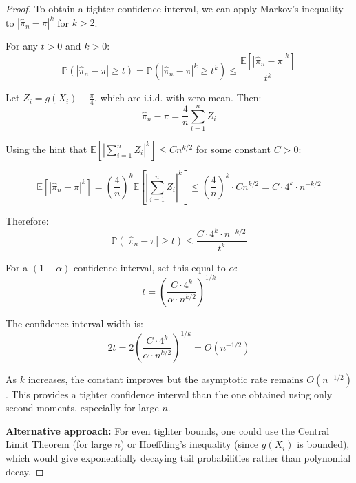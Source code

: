 \documentclass[12pt]{article}
\begin{document}
\begin{proof}
To obtain a tighter confidence interval, we can apply Markov's inequality to $|\hat{\pi}_n - \pi|^k$ for $k > 2$.

For any $t > 0$ and $k > 0$:
\[
\mathbb{P}(|\hat{\pi}_n - \pi| \geq t) = \mathbb{P}(|\hat{\pi}_n - \pi|^k \geq t^k) \leq \frac{\mathbb{E}[|\hat{\pi}_n - \pi|^k]}{t^k}
\]

Let $Z_i = g(X_i) - \frac{\pi}{4}$, which are i.i.d. with zero mean. Then:
\[
\hat{\pi}_n - \pi = \frac{4}{n}\sum_{i=1}^n Z_i
\]

Using the hint that $\mathbb{E}\left[\left|\sum_{i=1}^n Z_i\right|^k\right] \leq Cn^{k/2}$ for some constant $C > 0$:

\[
\mathbb{E}[|\hat{\pi}_n - \pi|^k] = \left(\frac{4}{n}\right)^k \mathbb{E}\left[\left|\sum_{i=1}^n Z_i\right|^k\right] \leq \left(\frac{4}{n}\right)^k \cdot Cn^{k/2} = C \cdot 4^k \cdot n^{-k/2}
\]

Therefore:
\[
\mathbb{P}(|\hat{\pi}_n - \pi| \geq t) \leq \frac{C \cdot 4^k \cdot n^{-k/2}}{t^k}
\]

For a $(1-\alpha)$ confidence interval, set this equal to $\alpha$:
\[
t = \left(\frac{C \cdot 4^k}{\alpha \cdot n^{k/2}}\right)^{1/k}
\]

The confidence interval width is:
\[
2t = 2\left(\frac{C \cdot 4^k}{\alpha \cdot n^{k/2}}\right)^{1/k} = O(n^{-1/2})
\]

As $k$ increases, the constant improves but the asymptotic rate remains $O(n^{-1/2})$. This provides a tighter confidence interval than the one obtained using only second moments, especially for large $n$.

\textbf{Alternative approach:} For even tighter bounds, one could use the Central Limit Theorem (for large $n$) or Hoeffding's inequality (since $g(X_i)$ is bounded), which would give exponentially decaying tail probabilities rather than polynomial decay.
\end{proof}
\end{document}

